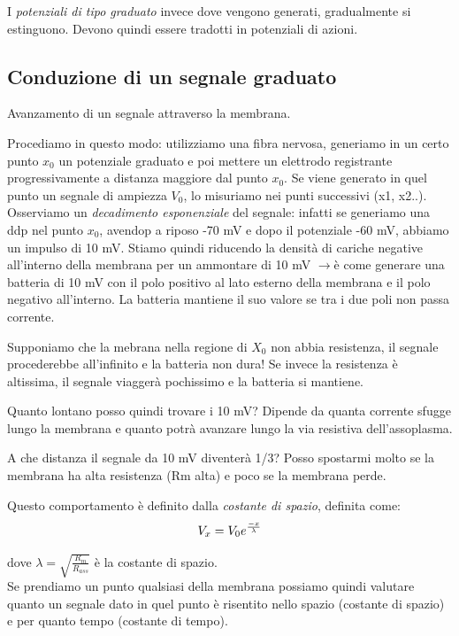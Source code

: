 \documentclass[a4paper,12pt]{article}
\newcommand{\lfreccia}{\ensuremath{\longrightarrow}}
\begin{document}
I \emph{potenziali di tipo graduato} invece dove vengono generati, gradualmente si estinguono. Devono quindi essere tradotti in potenziali di azioni.

\subsection{Conduzione di un segnale graduato}
Avanzamento di un segnale attraverso la membrana. 

Procediamo in questo modo: utilizziamo una fibra nervosa, generiamo in un certo punto $x_{0}$ un potenziale graduato e poi mettere un elettrodo registrante progressivamente a distanza maggiore dal punto $x_{0}$. Se viene generato in quel punto un segnale di ampiezza $V_{0}$, lo misuriamo nei punti successivi (x1, x2..). Osserviamo un \emph{decadimento esponenziale} del segnale: infatti se generiamo una ddp nel punto $x_{0}$, avendop a riposo -70 mV e dopo il potenziale -60 mV, abbiamo un impulso di 10 mV. Stiamo quindi riducendo la densità di cariche negative all'interno della membrana per un ammontare di 10 mV \lfreccia è come generare una batteria di 10 mV con il polo positivo al lato esterno della membrana e il polo negativo all'interno. La batteria mantiene il suo valore se tra i due poli non passa corrente. 
 
Supponiamo che la mebrana nella regione di $X_{0}$ non abbia resistenza, il segnale procederebbe all'infinito e la batteria non dura! Se invece la resistenza è altissima, il segnale viaggerà pochissimo e la batteria si mantiene.

Quanto lontano posso quindi trovare i 10 mV? Dipende da quanta corrente sfugge lungo la membrana e quanto potrà avanzare lungo la via resistiva dell'assoplasma.

A che distanza il segnale da 10 mV diventerà 1/3? Posso spostarmi molto se la membrana ha alta resistenza (Rm alta) e poco se la membrana perde.

Questo comportamento è definito dalla \emph{costante di spazio}, definita come:
\begin{equation}
\centering
V_{x}=V_{0} e^{\frac{-x}{\lambda}}
\end{equation}

dove $\lambda =\sqrt{\frac{R_{m}}{R_{ass}}}$ è la costante di spazio.\\

Se prendiamo un punto qualsiasi della membrana possiamo quindi valutare quanto un segnale dato in quel punto è risentito nello spazio (costante di spazio) e per quanto tempo (costante di tempo). 
\end{document}
